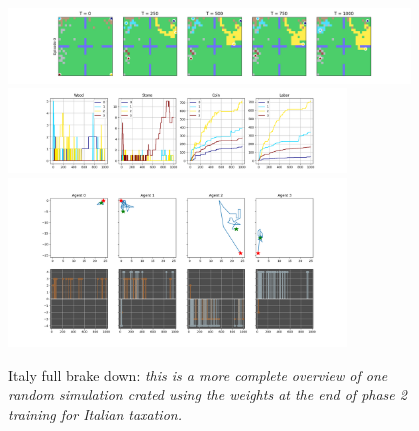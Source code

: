 \begin{figure}[h!]
    \centering
    \linespread{.9}
    \includegraphics[width=0.95\textwidth]{Resources/imgs/Figure_1_Ita.png}
    \includegraphics[width=0.80\textwidth]{Resources/imgs/Figure_2_Ita.png}
    \includegraphics[width=0.80\textwidth]{Resources/imgs/Figure_3_Ita.png}
    \caption[Italy full brake down: ]%
    {\label{img:p0_brakedown}Italy full brake down: \small \textit{this is a more complete overview of one random simulation crated using the weights at the end of phase 2 training for Italian taxation.}}
\end{figure}


